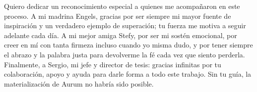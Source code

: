 \documentclass[
    11pt,
    spanish,
    singlespacing,
    parskip,
    headsepline,
    bookmarks=true,
    unicode=true,
    pdftoolbar=true,
    pdfmenubar=true,
    pdffitwindow=false,
    colorlinks=true,
    linkcolor=blue,
    citecolor=blue,
    urlcolor=blue
]{MastersDoctoralThesis}
\begin{document}



\frontmatter %
\pagestyle{plain} %


\begin{abstract}
\addchaptertocentry{\abstractname} %
En la presente memoria se desarrolla una prueba de concepto de una aplicación móvil nativa para iOS, capaz de procesar comandos de voz e interpretar intenciones transaccionales de forma 100\% local. Este sistema fue desarrollado para ser validado por el equipo de Identidad Digital del Banco Galicia Minorista.

Para su materialización, se utilizaron herramientas del ecosistema Apple como Swift, Xcode, la API AVFoundation y el framework Core ML.


\end{abstract}



\begin{acknowledgements}
\vspace{1.5cm}
Quiero dedicar un reconocimiento especial a quienes me acompañaron en este proceso. A mi madrina Engels, gracias por ser siempre mi mayor fuente de inspiración y un verdadero ejemplo de superación; tu fuerza me motiva a seguir adelante cada día. A mi mejor amiga Stefy, por ser mi sostén emocional, por creer en mí con tanta firmeza incluso cuando yo misma dudo, y por tener siempre el abrazo y la palabra justa para devolverme la fé cada vez que siento perderla. Finalmente, a Sergio, mi jefe y director de tesis: gracias infinitas por tu colaboración, apoyo y ayuda para darle forma a todo este trabajo. Sin tu guía, la materialización de Aurum no habría sido posible.
\end{acknowledgements}

\end{document}
